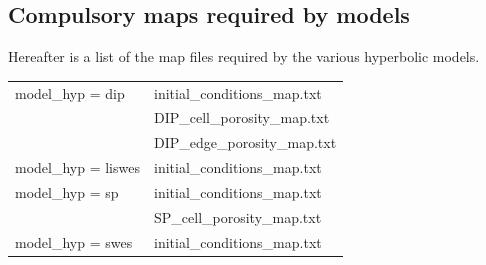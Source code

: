 \subsection{Compulsory maps required by models}
%
Hereafter is a list of the map files required by the various hyperbolic models. \\
\begin{tabular}{l|l}
\hline
model\_hyp = dip & initial\_conditions\_map.txt \\
                 & DIP\_cell\_porosity\_map.txt \\
                 & DIP\_edge\_porosity\_map.txt \\
\hline 
model\_hyp = liswes & initial\_conditions\_map.txt \\
\hline 
model\_hyp = sp & initial\_conditions\_map.txt \\
                & SP\_cell\_porosity\_map.txt \\
\hline 
model\_hyp = swes & initial\_conditions\_map.txt \\
\hline
\end{tabular}